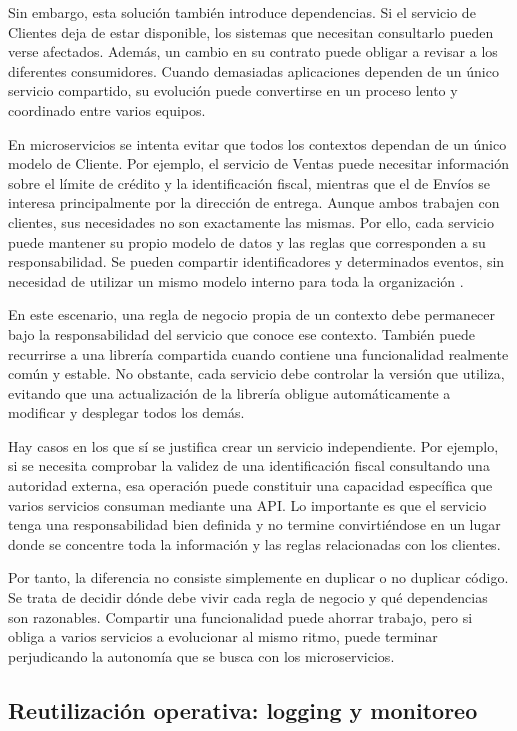 Sin embargo, esta solución también introduce dependencias. Si el servicio de Clientes deja de estar disponible, los sistemas que necesitan consultarlo pueden verse afectados. Además, un cambio en su contrato puede obligar a revisar a los diferentes consumidores. Cuando demasiadas aplicaciones dependen de un único servicio compartido, su evolución puede convertirse en un proceso lento y coordinado entre varios equipos.

En microservicios se intenta evitar que todos los contextos dependan de un único modelo de Cliente. Por ejemplo, el servicio de Ventas puede necesitar información sobre el límite de crédito y la identificación fiscal, mientras que el de Envíos se interesa principalmente por la dirección de entrega. Aunque ambos trabajen con clientes, sus necesidades no son exactamente las mismas. Por ello, cada servicio puede mantener su propio modelo de datos y las reglas que corresponden a su responsabilidad. Se pueden compartir identificadores y determinados eventos, sin necesidad de utilizar un mismo modelo interno para toda la organización \parencite{ford2021hard}.

En este escenario, una regla de negocio propia de un contexto debe permanecer bajo la responsabilidad del servicio que conoce ese contexto. También puede recurrirse a una librería compartida cuando contiene una funcionalidad realmente común y estable. No obstante, cada servicio debe controlar la versión que utiliza, evitando que una actualización de la librería obligue automáticamente a modificar y desplegar todos los demás.

Hay casos en los que sí se justifica crear un servicio independiente. Por ejemplo, si se necesita comprobar la validez de una identificación fiscal consultando una autoridad externa, esa operación puede constituir una capacidad específica que varios servicios consuman mediante una API. Lo importante es que el servicio tenga una responsabilidad bien definida y no termine convirtiéndose en un lugar donde se concentre toda la información y las reglas relacionadas con los clientes.

Por tanto, la diferencia no consiste simplemente en duplicar o no duplicar código. Se trata de decidir dónde debe vivir cada regla de negocio y qué dependencias son razonables. Compartir una funcionalidad puede ahorrar trabajo, pero si obliga a varios servicios a evolucionar al mismo ritmo, puede terminar perjudicando la autonomía que se busca con los microservicios.

\subsection{Reutilización operativa: logging y monitoreo}

